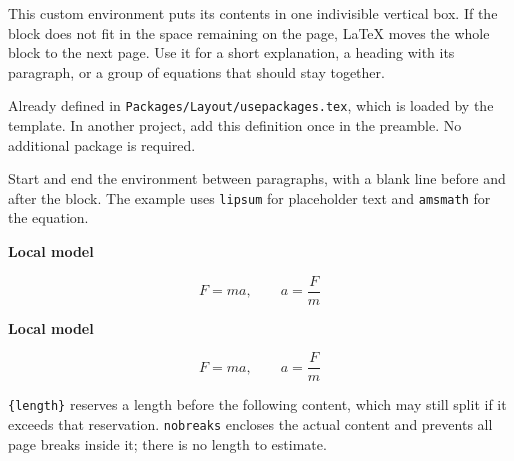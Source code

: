 \clearpage
{}
This custom environment puts its contents in one indivisible vertical box.
If the block does not fit in the space remaining on the page, LaTeX moves
the whole block to the next page. Use it for a short explanation, a heading
with its paragraph, or a group of equations that should stay together.

Already defined in \texttt{Packages/Layout/usepackages.tex}, which is
loaded by the template. In another project, add this definition once in
the preamble. No additional package is required.
\begin{referencecode}
\newenvironment{nobreaks}{\vbox\bgroup}{\egroup}
\end{referencecode}

Start and end the environment between paragraphs, with a blank line before
and after the block. The example uses \texttt{lipsum} for placeholder text
and \texttt{amsmath} for the equation.
\begin{referencecode}
\begin{nobreaks}
    \textbf{Local model}

    \lipsum[1][1-2]
    \[
        F = ma, \qquad a = \frac{F}{m}
    \]
    \lipsum[2][1]
\end{nobreaks}
\end{referencecode}

\begin{nobreaks}
    \textbf{Local model}

    \lipsum[1][1-2]
    \[
        F = ma, \qquad a = \frac{F}{m}
    \]
    \lipsum[2][1]
\end{nobreaks}

\texttt{\string\Needspace\{length\}} reserves a length before the following
content, which may still split if it exceeds that reservation.
\texttt{nobreaks} encloses the actual content and prevents all page breaks
inside it; there is no length to estimate.

